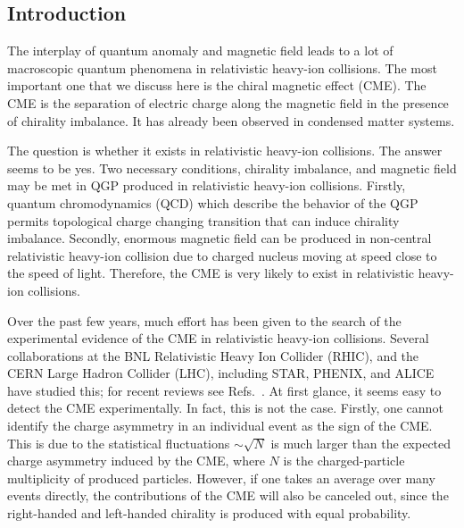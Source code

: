 \documentclass[a4paper,10pt,twoside]{cpc-hepnp}
\begin{document}
\begin{CJK*}{GBK}{song}
%

\begin{multicols}{2}

\section{Introduction}\label{intro}
The interplay of quantum anomaly and magnetic field leads to a lot of macroscopic quantum phenomena in relativistic heavy-ion collisions. The most important one that we discuss here is the chiral magnetic effect (CME). The CME is the separation of electric charge along the magnetic field in the presence of chirality imbalance\cite{Kharzeev:2007jp,Warringa:2008kv,Fukushima:2008xe}. It has already been observed in condensed matter systems\cite{Li:2014bha}.

The question is whether it exists in relativistic heavy-ion collisions. The answer seems to be yes. Two necessary conditions, chirality imbalance, and magnetic field may be met in QGP produced in relativistic heavy-ion collisions. Firstly, quantum chromodynamics (QCD) which describe the behavior of the QGP permits topological charge changing transition that can induce chirality imbalance\cite{Kharzeev:2007jp}. Secondly, enormous magnetic field can be produced in non-central relativistic heavy-ion collision due to charged nucleus moving at speed close to the speed of light\cite{Skokov:2009qp,Voronyuk:2011jd,Bzdak:2011yy,Deng:2012pc,Tuchin:2013apa,Mo:2013qya}. Therefore, the CME is very likely to exist in relativistic heavy-ion collisions.

Over the past few years, much effort has been given to the search of the experimental evidence of the CME in relativistic heavy-ion collisions. Several collaborations at the BNL Relativistic Heavy Ion Collider (RHIC), and the CERN Large Hadron Collider (LHC), including STAR\cite{Abelev2009ac, Abelev:2009ad, Voloshin:2008jx, PhysRevC.88.064911, Wang:2012qs, Adamczyk:2014mzf, Adamczyk:2013kcb}, PHENIX\cite{Ajitanand:2010}, and ALICE\cite{Christakoglou:2011uqg,PhysRevLett.110.012301} have studied this; for recent reviews see Refs.~\cite{Wang:2016mkm}.
At first glance, it seems easy to detect the CME experimentally. In fact, this is not the case. Firstly, one cannot identify the charge asymmetry in an individual event as the sign of the CME. This is due to the statistical fluctuations $\sim \sqrt{N}$ is much larger than the expected charge asymmetry induced by the CME, where $N$ is the charged-particle multiplicity of produced particles\cite{Kharzeev:2007jp}. However, if one takes an average over many events directly, the contributions of the CME will also be canceled out, since the right-handed and left-handed chirality is produced with equal probability.


\end{multicols}
\end{CJK*}
\end{document}
